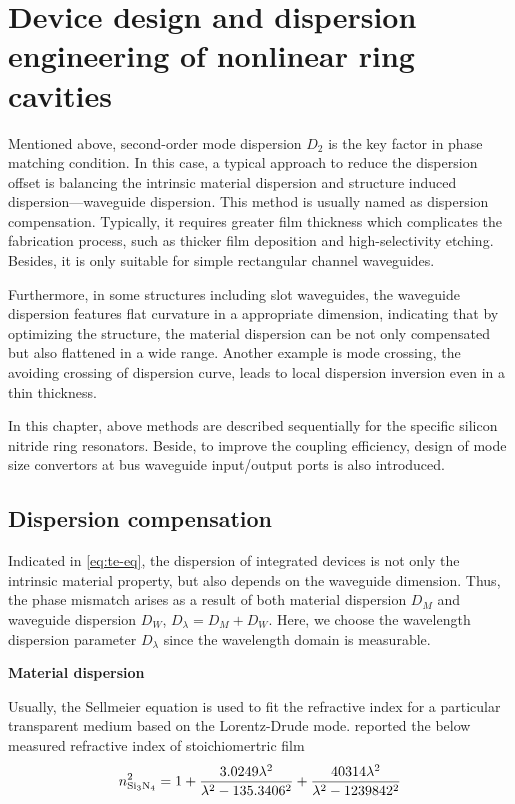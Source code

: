 
\chapter{Device design and dispersion engineering of nonlinear ring cavities}\label{chap:3}

Mentioned above, %
second-order mode dispersion $ D_2 $ is the key factor in phase matching condition. In this case, a typical approach to reduce the dispersion offset is balancing the intrinsic material dispersion and structure induced dispersion---waveguide dispersion. This method is usually named as dispersion compensation. Typically, it requires greater film thickness which complicates the fabrication process, such as thicker film deposition and high-selectivity etching. Besides, it is only suitable for simple rectangular channel waveguides.

Furthermore, in some structures including slot waveguides, the waveguide dispersion features flat curvature in a appropriate dimension, indicating that by optimizing the structure, the material dispersion can be not only compensated but also flattened in a wide range. Another example is mode crossing, the avoiding crossing of dispersion curve, leads to local dispersion inversion even in a thin thickness. 

In this chapter, above methods are described sequentially for the specific silicon nitride ring resonators. Beside, to improve the coupling efficiency, design of mode size convertors at bus waveguide input/output ports is also introduced.

\section{Dispersion compensation}\label{sec:disp-comp}
Indicated in \autoref{eq:te-eq}, the dispersion of integrated devices is not only the intrinsic material property, but also depends on the waveguide dimension. Thus, the phase mismatch arises as a result of both material dispersion $D_M$ and waveguide dispersion $ D_W $, $D_{\lambda}= D_M + D_W$. Here, we choose the wavelength dispersion parameter $ D_{\lambda} $ since the wavelength domain is measurable.

\bigskip
\noindent\textbf{Material dispersion}

Usually, the Sellmeier equation is used to fit the refractive index for a particular transparent medium based on the Lorentz-Drude mode. \citeauthor{Luke2015a} reported the below measured refractive index of stoichiomertric  film \cite{Luke2015a}
\begin{equation}\label{eq:si3n4-selleimeier}
    n_{\ce{Si3N4}}^2 = 1 + \frac{3.0249 \lambda^2}{\lambda^2-135.3406^2} + \frac{40314 \lambda^2}{\lambda^2 - 1239842^2}
\end{equation}


